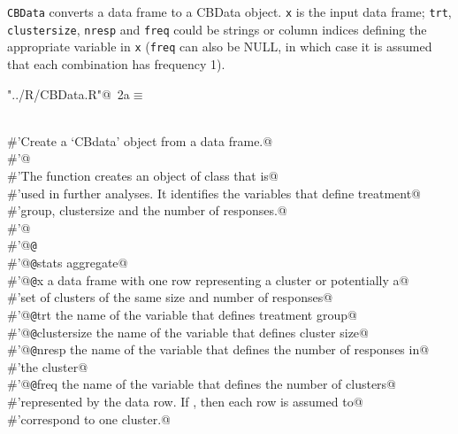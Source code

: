 \documentclass[reqno]{amsart}
\renewcommand{\NWtarget}[2]{\hypertarget{#1}{#2}}
\begin{document}
\texttt{CBData} converts a data frame to a CBData object. \texttt{x}
is the input data frame; \texttt{trt}, \texttt{clustersize}, \texttt{nresp} and
\texttt{freq} could be strings or column indices defining the appropriate
variable in \texttt{x} (\texttt{freq} can also be NULL, in which case it is 
assumed that each combination has frequency 1).
\begin{flushleft} \small\label{scrap2}\raggedright\small
\NWtarget{nuweb2a}{} \verb@"../R/CBData.R"@\nobreak\ {\footnotesize {2a}}$\equiv$
\vspace{-1ex}
\begin{list}{}{} \item
\mbox{}\verb@@\\
\mbox{}\verb@#'Create a `CBdata' object from a data frame.@\\
\mbox{}\verb@#'@\\
\mbox{}\verb@#'The  function creates an object of class  that is@\\
\mbox{}\verb@#'used in further analyses. It identifies the variables that define treatment@\\
\mbox{}\verb@#'group, clustersize and the number of responses.@\\
\mbox{}\verb@#'@\\
\mbox{}\verb@#'@{\tt @}\verb@export@\\
\mbox{}\verb@#'@{\tt @}\verb@importFrom stats aggregate@\\
\mbox{}\verb@#'@{\tt @}\verb@param x a data frame with one row representing a cluster or potentially a@\\
\mbox{}\verb@#'set of clusters of the same size and number of responses@\\
\mbox{}\verb@#'@{\tt @}\verb@param trt the name of the variable that defines treatment group@\\
\mbox{}\verb@#'@{\tt @}\verb@param clustersize the name of the variable that defines cluster size@\\
\mbox{}\verb@#'@{\tt @}\verb@param nresp the name of the variable that defines the number of responses in@\\
\mbox{}\verb@#'the cluster@\\
\mbox{}\verb@#'@{\tt @}\verb@param freq the name of the variable that defines the number of clusters@\\
\mbox{}\verb@#'represented by the data row. If , then each row is assumed to@\\
\mbox{}\verb@#'correspond to one cluster.@\\

\end{list}
\end{flushleft}
\end{document}
